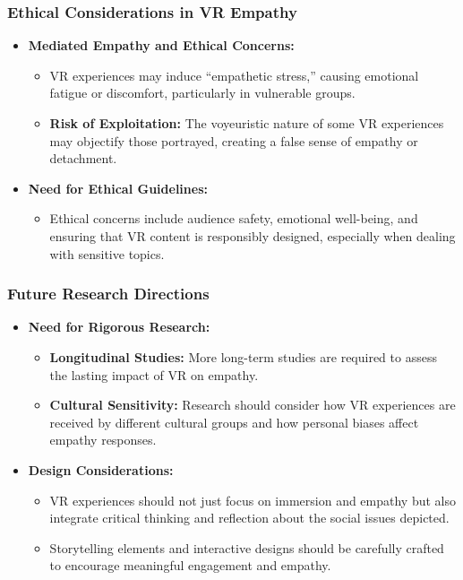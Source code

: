 \documentclass[aspectratio=169,xcolor=dvipsnames]{beamer}
\begin{document}
\begin{frame}
\frametitle{Ethical Considerations in VR Empathy}
\begin{itemize}
    \item \textbf{Mediated Empathy and Ethical Concerns:}
    \begin{itemize}
        \item VR experiences may induce “empathetic stress,” causing emotional fatigue or discomfort, particularly in vulnerable groups.
        \item \textbf{Risk of Exploitation:} The voyeuristic nature of some VR experiences may objectify those portrayed, creating a false sense of empathy or detachment.
    \end{itemize}
    \item \textbf{Need for Ethical Guidelines:}
    \begin{itemize}
        \item Ethical concerns include audience safety, emotional well-being, and ensuring that VR content is responsibly designed, especially when dealing with sensitive topics.
    \end{itemize}
\end{itemize}
\end{frame}

\begin{frame}
\frametitle{Future Research Directions}
\begin{itemize}
    \item \textbf{Need for Rigorous Research:}
    \begin{itemize}
        \item \textbf{Longitudinal Studies:} More long-term studies are required to assess the lasting impact of VR on empathy.
        \item \textbf{Cultural Sensitivity:} Research should consider how VR experiences are received by different cultural groups and how personal biases affect empathy responses.
    \end{itemize}
    \item \textbf{Design Considerations:}
    \begin{itemize}
        \item VR experiences should not just focus on immersion and empathy but also integrate critical thinking and reflection about the social issues depicted.
        \item Storytelling elements and interactive designs should be carefully crafted to encourage meaningful engagement and empathy.
    \end{itemize}
\end{itemize}
\end{frame}
\end{document}
